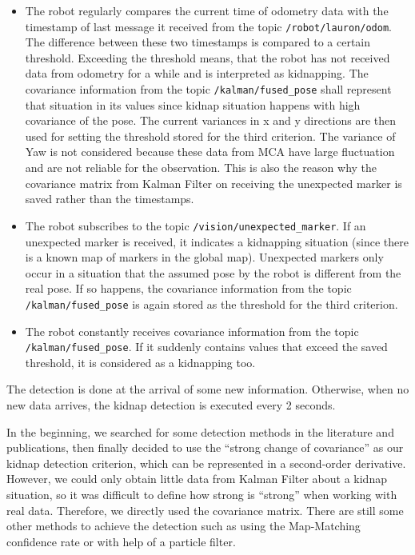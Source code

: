 \begin{itemize}
\item The robot regularly compares the current time of odometry data with the timestamp of last message it received from the topic \texttt{/robot/lauron/odom}. The difference between these two timestamps is compared to a certain threshold. Exceeding the threshold means, that the robot has not received data from odometry for a while and is interpreted as kidnapping. The covariance information from the topic \texttt{/kalman/fused\_pose} shall represent that situation in its values since kidnap situation happens with high covariance of the pose. The current variances in x and y directions are then used for setting the threshold stored for the third criterion.
The variance of Yaw is not considered because these data from MCA have large fluctuation and are not reliable for the observation. This is also the reason why the covariance matrix from Kalman Filter on receiving the unexpected marker is saved rather than the timestamps.
\item The robot subscribes to the topic \texttt{/vision/unexpected\_marker}. If an unexpected marker is received, it indicates a kidnapping situation (since there is a known map of markers in the global map). Unexpected markers only occur in a situation that the assumed pose by the robot is different from the real pose. If so happens, the covariance information from the topic \texttt{/kalman/fused\_pose} is again stored as the threshold for the third criterion.
\item The robot constantly receives covariance information from the topic
\\
\texttt{/kalman/fused\_pose}. If it suddenly contains values that exceed the saved threshold, it is considered as a kidnapping too.
\end{itemize}

The detection is done at the arrival of some new information. Otherwise, when no new data arrives, the kidnap detection is executed every 2 seconds.
 
In the beginning, we searched for some detection methods in the literature and publications, then finally decided to use the ``strong change of covariance'' as our kidnap detection criterion, which can be represented in a second-order derivative. However, we could only obtain little data from Kalman Filter about a kidnap situation, so it was difficult to define how strong is ``strong'' when working with real data. Therefore, we directly used the covariance matrix. There are still some other methods to achieve the detection such as using the Map-Matching confidence rate or with help of a particle filter.


